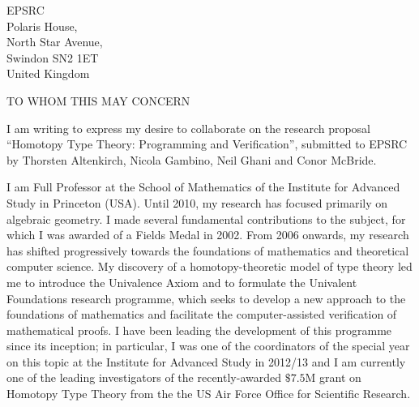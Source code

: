 \documentclass[10pt,a4paper,oneside]{letter}
\date{July 7th, 2014}
\begin{document}
\begin{letter}{
EPSRC \\
Polaris House, \\
North Star Avenue, \\
Swindon SN2 1ET\\
United Kingdom}

\opening{TO WHOM THIS MAY CONCERN}

I am writing to express my desire to collaborate on the research proposal
``Homotopy Type Theory: Programming and Verification'', submitted to
EPSRC by Thorsten Altenkirch, Nicola Gambino, Neil Ghani and Conor
McBride. 

I am Full Professor at the School of Mathematics of the Institute for
Advanced Study in Princeton (USA).  Until 2010, my research has
focused primarily on algebraic geometry. I made several fundamental
contributions to the subject, for which I was awarded of a Fields
Medal in 2002. From 2006 onwards, my research has shifted
progressively towards the foundations of mathematics and theoretical
computer science. My discovery of a homotopy-theoretic model of type
theory led me to introduce the Univalence Axiom and to formulate the
Univalent Foundations research programme, which seeks to develop a new
approach to the foundations of mathematics and facilitate the
computer-assisted verification of mathematical proofs. I have been
leading the development of this programme since its inception; in
particular, I was one of the coordinators of the special year on this
topic at the Institute for Advanced Study in 2012/13 and I am
currently one of the leading investigators of the recently-awarded
$\$7.5$M grant on Homotopy Type Theory from the the US Air Force
Office for Scientific Research.


\end{letter}
\end{document}
